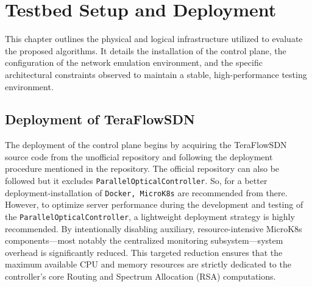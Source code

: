 \chapter{Testbed Setup and Deployment}
This chapter outlines the physical and logical infrastructure utilized to evaluate the proposed algorithms. It details the installation of the control plane, the configuration of the network emulation environment, and the specific architectural constraints observed to maintain a stable, high-performance testing environment.
\section{Deployment of TeraFlowSDN}
The deployment of the control plane begins by acquiring the TeraFlowSDN source code from the unofficial repository\cite{chafiTFSGit} and following the deployment procedure mentioned in the repository. The official repository can also be followed\cite{tfsRepo} but it excludes \texttt{ParallelOpticalController}. So, for a better deployment-installation of \texttt{Docker, MicroK8s} are recommended from there. However, to optimize server performance during the development and testing of the \texttt{ParallelOpticalController}, a lightweight deployment strategy is highly recommended. By intentionally disabling auxiliary, resource-intensive MicroK8s components—most notably the centralized monitoring subsystem—system overhead is significantly reduced. This targeted reduction ensures that the maximum available CPU and memory resources are strictly dedicated to the controller's core Routing and Spectrum Allocation (RSA) computations.

